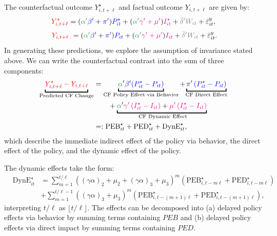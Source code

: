 \documentclass[11pt,reqno,letter]{amsart}
\theoremstyle{definition}
\def\bcolor{\color{ForestGreen}}
\def\pcolor{\color{blue}}
\def\icolor{\color{magenta}}
\def\wcolor{\color{gray}}
\def\ycolor{\color{red}}
\begin{document}
The counterfactual outcome $Y^\star_{i,t+\ell}$  and  factual outcome $Y_{i,t+\ell}$  are given by:
$$
 {\ycolor Y^\star_{i,t+\ell}} = ( {\bcolor\alpha '} {\pcolor \beta'}  + {\pcolor\pi'})
    {\pcolor P^\star_{it}} + ({\bcolor\alpha '}  {\icolor \gamma' + \mu'})
    {\icolor I^\star_{it} }+ {\wcolor \bar \delta 'W_{it}} + \bar \varepsilon_{it}^y, $$$$\ {\ycolor Y_{i,t+\ell}} \ =
    ( {\bcolor\alpha '}  {\pcolor \beta'} + {\pcolor\pi'})
    {\pcolor P_{it}} + ({\bcolor\alpha '}  {\icolor \gamma' + \mu'})
    {\icolor I_{it} }+ {\wcolor \bar \delta 'W_{it}} + \bar \varepsilon_{it}^y.
$$
In generating these predictions, we explore the assumption of invariance stated above.
We can write  the counterfactual contrast into the sum of three components:
  \begin{align}
 \underbracket{{\ycolor Y^\star_{i,t+\ell} -  Y_{i,t+\ell} }}_{\text{Predicted CF Change}} & =
\underbracket{{\bcolor\alpha}' {\pcolor\beta}' {\pcolor\left(P^\star_{it} - P_{it} \right)}}_{\text{CF Policy Effect via Behavior}}  +    {\underbracket{\pcolor\pi' \left( P^\star_{it} -  P_{it} \right)}_{\text{CF Direct  Effect}} } \nonumber\\
&\qquad +  {\underbracket{{\bcolor\alpha}' {\icolor{\gamma}'  \left( I^\star_{it} - I_{it} \right)}+ {\icolor{\mu}'  \left( I^\star_{it} -  I_{it} \right)}}_{\text{ CF Dynamic Effect}}} \nonumber \\
 & =:   \mathrm{PEB}^\star_{it} + \mathrm{PED}^\star_{it} + \mathrm{DynE}^\star_{it}, \label{eqn:DC2}
  \end{align}
 which describe the immediate indirect effect of the policy via behavior, the direct effect of the policy, and the dynamic effect
 of the policy.

The dynamic effects take the form:
$$
\begin{array}{lll}
  & \mathrm{DynE}^\star_{it} &=
  \sum_{m=1}^{t/\ell} \left( (\gamma \alpha)_2 + \mu_2+  (\gamma \alpha)_3+ \mu_3    \right)^m \left(\mathrm{PEB}^\star_{i,t-m \ell } +  \mathrm{PED}^\star_{i,t- m\ell} \right)
  \\
 &&  + \sum_{m=1}^{t/\ell-1} \left( (\gamma \alpha)_3 + \mu_3    \right)^m \left (\mathrm{PEB}^\star_{i,t-(m +1) \ell } +  \mathrm{PED}^\star_{i,t- (m+1)\ell}  \right),
 \end{array}
 $$
 interpreting $t/\ell$ as $\lfloor t/\ell \rfloor$.
 The effects can be decomposed into (a) delayed policy effects via behavior by
summing terms containing $PEB$ and (b) delayed policy effects via direct impact
by summing terms containing $PED$.
\end{document}
